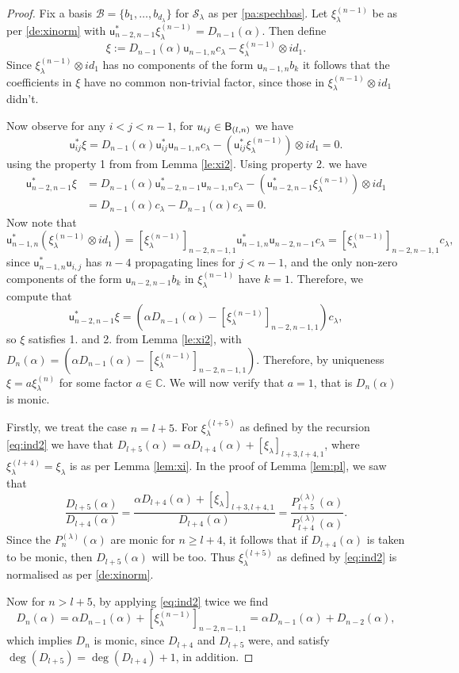 \documentclass{article}
\theoremstyle{definition}
\def\uu{{\mathsf u}} %
\def\SS{\mathcal{S}} %
\def\BB{\mathcal{B}} %
\def\a{\alpha}
\def\l{\lambda}
\def\C{\mathbb{C}}
\numberwithin{equation}{subsection}
\begin{document}
\begin{proof} Fix a basis $\BB=\{b_1,\dots, b_{d_\l}\}$ for $\SS_\l$ as per \ref{pa:spechbas}. Let $\xi_{\l}^{(n-1)}$ be as per \ref{de:xinorm} with $\uu_{n-2,n-1}^*\xi_{\l}^{(n-1)}=D_{n-1}(\a)$. Then define
\[\xi:= D_{n-1}(\a) \uu_{n-1,n}c_{\l}-\xi_{\l}^{(n-1)}\otimes id_1.\]
Since $\xi_{\l}^{(n-1)}\otimes id_1$ has no components of the form $\uu_{n-1,n} b_k$ it follows that the coefficients in $\xi$ have no common non-trivial factor, since those in $\xi_{\l}^{(n-1)}\otimes id_1$ didn't.

Now observe for any $i<j<n-1$, for $u_{ij}\in {\mathsf B}_{(l,n)}$ we have
\[ \uu_{ij}^*\xi=D_{n-1}(\a) \uu_{ij}^*\uu_{n-1,n}c_{\l}-(\uu_{ij}^*\xi_{\l}^{(n-1)})\otimes id_1=0.\]
using the property 1 from from Lemma \ref{le:xi2}. Using property 2. we have 
\begin{align*}
    \uu_{n-2,n-1}^*\xi&=D_{n-1}(\a) \uu_{n-2,n-1}^*\uu_{n-1,n}c_{\l}-(\uu_{n-2,n-1}^*\xi_{\l}^{(n-1)})\otimes id_1\\
    &=D_{n-1}(\a)c_\l-D_{n-1}(\a)c_\l=0.
\end{align*}
Now note that 
\[\uu_{n-1,n}^* (\xi_{\l}^{(n-1)}\otimes id_1)=[\xi_{\l}^{(n-1)}]_{n-2,n-1,1 }\uu_{n-1,n}^*\uu_{n-2,n-1} c_\l=[\xi_{\l}^{(n-1)}]_{n-2,n-1,1 } c_\l,\]
since $\uu_{n-1,n}^*\uu_{i,j}$ has $n-4$ propagating lines for $j<n-1$, and the only non-zero components of the form $\uu_{n-2,n-1}b_{k}$ in $\xi_{\l}^{(n-1)}$ have $k=1$. Therefore, we compute that 
\[\uu_{n-2,n-1}^*\xi =(\a D_{n-1}(\a)-[\xi_{\l}^{(n-1)}]_{n-2,n-1,1 })c_\l,\]
so $\xi$ satisfies 1. and 2. from Lemma \ref{le:xi2}, with $D_n(\a)=(\a D_{n-1}(\a)-[\xi_{\l}^{(n-1)}]_{n-2,n-1,1 })$. Therefore, by uniqueness $\xi= a \xi^{(n)}_\l$ for some factor $a\in \C$. We will now verify that $a=1$, that is $D_n(\a)$ is monic.

Firstly, we treat the case $n=l+5$. For $\xi^{(l+5)}_\l$ as defined by the recursion \eqref{eq:ind2} we have that $D_{l+5}(\a)=\a D_{l+4}(\a) +[\xi_\l]_{l+3,l+4,1}$, where $\xi_\l^{(l+4)}=\xi_\l$ is as per Lemma \ref{lem:xi}. In the proof of Lemma \ref{lem:pl}, we saw that 
\[
\frac{D_{l+5}(\a)}{D_{l+4}(\a)}=\frac{\a D_{l+4}(\a)+[\xi_\l]_{l+3,l+4,1}}{D_{l+4}(\a)}=\frac{P_{l+5}^{(\l)}(\a)}{P_{l+4}^{(\l)}(\a)}.
\]
Since the $P_{n}^{(\l)}(\a)$ are monic for $n\geq l+4$, it follows that if $D_{l+4}(\a)$ is taken to be monic, then $D_{l+5}(\a)$ will be too. Thus $\xi^{(l+5)}_\l$ as defined by \eqref{eq:ind2} is normalised as per \ref{de:xinorm}. 

Now for $n>l+5$, by applying \eqref{eq:ind2} twice we find
\[D_{n}(\a)=\a D_{n-1}(\a)+[\xi_{\l}^{(n-1)}]_{n-2,n-1,1 }=\a D_{n-1}(\a)+D_{n-2}(\a),\]
which implies $D_{n}$ is monic, since $D_{l+4}$ and $D_{l+5}$ were, and satisfy $\deg(D_{l+5})=\deg(D_{l+4})+1$, in addition.\end{proof}
\end{document}
